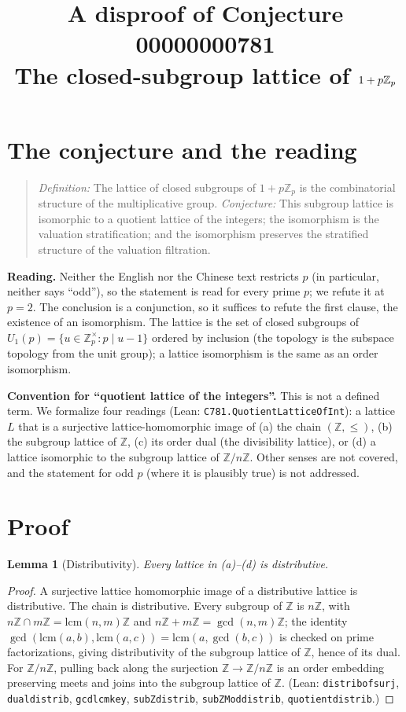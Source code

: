 \documentclass[11pt]{article}
\title{A disproof of Conjecture 00000000781\\[2pt]
\large The closed-subgroup lattice of $1+p\Zp$}
\date{}
\renewcommand{\_}{\oldus\allowbreak}
\newtheorem{lemma}{Lemma}
\newcommand{\Z}{\mathbb{Z}}
\newcommand{\Zp}{\mathbb{Z}_p}
\begin{document}
\sloppy
\maketitle

\section{The conjecture and the reading}

\begin{quote}
\emph{Definition:} The lattice of closed subgroups of $1+p\Zp$ is the combinatorial structure of the
multiplicative group. \emph{Conjecture:} This subgroup lattice is isomorphic to a quotient lattice of the
integers; the isomorphism is the valuation stratification; and the isomorphism preserves the stratified
structure of the valuation filtration.
\end{quote}

\textbf{Reading.} Neither the English nor the Chinese text restricts $p$ (in particular, neither says
``odd''), so the statement is read for every prime $p$; we refute it at $p=2$. The conclusion is a
conjunction, so it suffices to refute the first clause, the existence of an isomorphism. The lattice is the set
of closed subgroups of $U_1(p)=\{u\in\Zp^\times : p \mid u-1\}$ ordered by inclusion (the topology is the
subspace topology from the unit group); a lattice isomorphism is the same as an order isomorphism.

\textbf{Convention for ``quotient lattice of the integers''.} This is not a defined term. We formalize four
readings (Lean: \texttt{C781.QuotientLatticeOfInt}): a lattice $L$ that is a surjective lattice-homomorphic
image of (a) the chain $(\Z,\le)$, (b) the subgroup lattice of $\Z$, (c) its order dual (the divisibility
lattice), or (d) a lattice isomorphic to the subgroup lattice of $\Z/n\Z$. Other senses are not covered,
and the statement for odd $p$ (where it is plausibly true) is not addressed.

\section{Proof}

\begin{lemma}[Distributivity]
Every lattice in (a)--(d) is distributive.
\end{lemma}
\begin{proof}
A surjective lattice homomorphic image of a distributive lattice is distributive. The chain is distributive.
Every subgroup of $\Z$ is $n\Z$, with $n\Z\cap m\Z=\mathrm{lcm}(n,m)\Z$ and $n\Z+m\Z=\gcd(n,m)\Z$; the
identity $\gcd(\mathrm{lcm}(a,b),\mathrm{lcm}(a,c))=\mathrm{lcm}(a,\gcd(b,c))$ is checked on prime
factorizations, giving distributivity of the subgroup lattice of $\Z$, hence of its dual. For
$\Z/n\Z$, pulling back along the surjection $\Z\to\Z/n\Z$ is an order embedding preserving meets and joins into
the subgroup lattice of $\Z$. (Lean: \texttt{distrib\_of\_surj}, \texttt{dual\_distrib}, \texttt{gcd\_lcm\_key},
\texttt{subZ\_distrib}, \texttt{subZMod\_distrib}, \texttt{quotient\_distrib}.)
\end{proof}
\end{document}
